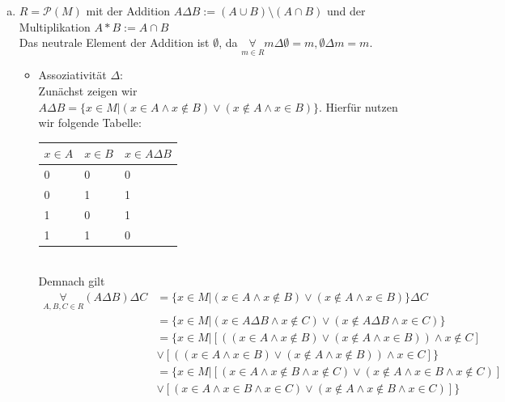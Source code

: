 \documentclass{article}
\begin{document}
\begin{enumerate}[(a)]
    \item
        \color{blue}
        $R=\mathcal P(M)$ mit der Addition
        $A\Delta B:=(A\cup B)\setminus (A\cap B)$
        und der Multiplikation
        $A*B:=A\cap B$\\
        \color{black}
        Das neutrale Element der Addition ist $\emptyset$,
        da $\underset{m\in R}\forall m\Delta \emptyset=m,
        \emptyset\Delta m=m$.

        \begin{itemize}
            \item
                Assoziativität $\Delta$:\\
                Zunächst zeigen wir $A\Delta B=\{x\in M|(x\in A\land x\notin B)\lor (x\notin A\land x\in B)\}$.
                Hierfür nutzen wir folgende Tabelle:\\
                \begin{tabular}{ll|l}
                    $x\in A$&$x\in B$&$x\in A\Delta B$\\
                    \hline
                    0&0&0\\
                    0&1&1\\
                    1&0&1\\
                    1&1&0
                \end{tabular}\\
                Demnach gilt
                \begin{align*}
                    \underset{A,B,C\in R}\forall (A\Delta B)\Delta C
                    &=\{x\in M|(x\in A\land x\notin B)\lor (x\notin A\land x\in B)\}\Delta C\\
                    &=\{x\in M|(x\in A\Delta B\land x\notin C)\lor (x\notin A\Delta B\land x\in C)\}\\
                    &=\{x\in M|
                    [((x\in A\land x\notin B)\lor (x\notin A\land x\in B))\land x\notin C]\\
                    &\lor[((x\in A\land x\in B)\lor (x\notin A\land x\notin B))\land x\in C]
                    \}\\
                    &=\{x\in M|
                    [(x\in A\land x\notin B\land x\notin C)\lor (x\notin A\land x\in B\land x\notin C)]\\
                    &\lor[(x\in A\land x\in B\land x\in C)\lor (x\notin A\land x\notin B\land x\in C)]
                    \}\\

\end{align*}
\end{itemize}
\end{enumerate}
\end{document}
